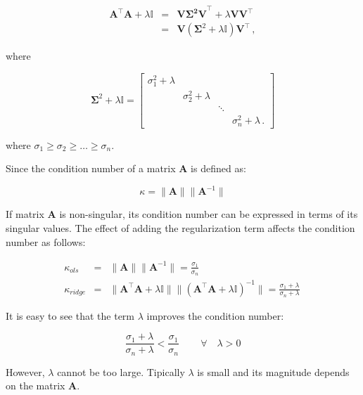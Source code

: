 \begin{eqnarray*}
\mathbf{A}^\top \mathbf{A}+\lambda \mathbb{I}&=&\mathbf{V\Sigma^2
V}^\top + \lambda \mathbf{V} \mathbf{V}^\top\\ &=&\mathbf{V}
(\mathbf{\Sigma}^2+\lambda\mathbb{I}) \mathbf{V}^\top \, ,
\end{eqnarray*}

\noindent where

\begin{equation*}
\mathbf{\Sigma}^2+\lambda\mathbb{I}=
\begin{bmatrix}
\sigma^2_1 + \lambda & \, & \, \\
\, & \sigma^2_2 +\lambda & \, \\
\, & \, & \ddots & \, \\
\, & \, & \, & \sigma^2_n +\lambda \, .
\end{bmatrix}
\end{equation*}

where $\sigma_1 \geq \sigma_2 \geq \dots \geq \sigma_n$.

Since the condition number of a matrix $\mathbf{A}$ is defined as:

\begin{equation*}
	\kappa = \|\mathbf{A}\| \|\mathbf{A}^{-1}\|
\end{equation*}

If matrix $\mathbf{A}$ is non-singular, its condition number can be
expressed in terms of its singular values. The effect of adding the
regularization term affects the condition number as follows:

\begin{eqnarray*}
\kappa_{ols} &=& \|\mathbf{A}\| \|\mathbf{A}^{-1}\|=\frac{\sigma_1}{\sigma_n} \\
\kappa_{ridge} &=& \|\mathbf{A}^\intercal \mathbf{A} + \lambda \mathbb{I}\| 
\|(\mathbf{A}^\intercal \mathbf{A} + \lambda \mathbb{I})^{-1}\|=\frac{\sigma_1+\lambda}{\sigma_n + \lambda} \,
\end{eqnarray*}

It is easy to see that the term $\lambda$ improves the condition number: 

\begin{equation*}
        \frac{\sigma_1+\lambda}{\sigma_n + \lambda} <
        \frac{\sigma_1}{\sigma_n} \,  \qquad \forall \quad \lambda > 0
\end{equation*}


However, $\lambda$ cannot be too large. Tipically $\lambda$ is small and its
magnitude depends on the matrix $\mathbf{A}$.

